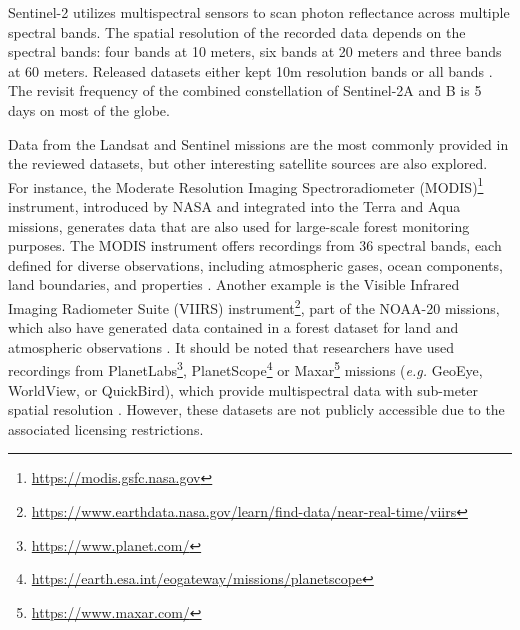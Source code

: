 \documentclass{CUP-JNL-DTM}%
\theoremstyle{definition}
\numberwithin{equation}{section}
\begin{document}
Sentinel-2 utilizes multispectral sensors to scan photon reflectance across multiple spectral bands.
The spatial resolution of the recorded data depends on the spectral bands: four bands at 10 meters, six bands at 20 meters and three bands at 60 meters. Released datasets either kept 10m resolution bands \cite{schmitt_sen12ms_2019, bastani_satlas_2022, lee_multiearth_2022} or all bands \cite{sumbul_bigearthnet-mm_2021}.
The revisit frequency of the combined constellation of Sentinel-2A and B is 5 days on most of the globe.

Data from the Landsat and Sentinel missions are the most commonly provided in the reviewed datasets, but other interesting satellite sources are also explored. For instance, the Moderate Resolution Imaging Spectroradiometer (MODIS)\footnote{\url{https://modis.gsfc.nasa.gov}} instrument, introduced by NASA and integrated into the Terra and Aqua missions, generates data that are also used for large-scale forest monitoring purposes.
The MODIS instrument offers recordings from 36 spectral bands, each defined for diverse observations, including atmospheric gases, ocean components, land boundaries, and properties \cite{schmitt_sen12ms_2019, levin_unveiling_2021}.
%
Another example is the Visible Infrared Imaging Radiometer Suite (VIIRS) instrument\footnote{\url{https://www.earthdata.nasa.gov/learn/find-data/near-real-time/viirs}}, part of the NOAA-20 missions, which also have generated data contained in a forest dataset for land and atmospheric observations \cite{levin_unveiling_2021}.
%
It should be noted that researchers have used recordings from PlanetLabs\footnote{\url{https://www.planet.com/}}, PlanetScope\footnote{\url{https://earth.esa.int/eogateway/missions/planetscope}} or Maxar\footnote{\url{https://www.maxar.com/}} missions (\textit{e.g.} GeoEye, WorldView, or QuickBird), which provide multispectral data with sub-meter spatial resolution \cite{brandt_unexpectedly_2020}. However, these datasets are not publicly accessible due to the associated licensing restrictions.
\end{document}

